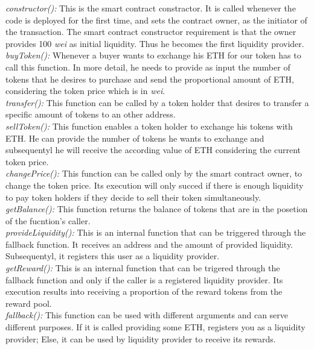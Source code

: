 \documentclass[12pt,a4paper]{article}
\begin{document}
\emph{constructor():} This is the smart contract constractor. It is called
whenever the code is deployed for the first time, and sets the contract owner,
as the initiator of the transaction. The smart contract constructor requirement
is that the owner provides 100 \emph{wei} as initial liquidity. Thus he becomes
the first liquidity provider.\\

\emph{buyToken():} Whenever a buyer wants to exchange his ETH for our token has
to call this function. In more detail, he needs to provide as input the number
of tokens that he desires to purchase and send the proportional amount of ETH,
considering the token price which is in \emph{wei}.\\

\emph{transfer():} This function can be called by a token holder that desires to
transfer a specific amount of tokens to an other address.\\

\emph{sellToken():} This function enables a token holder to exchange his tokens
with ETH. He can provide the number of tokens he wants to exchange and
subsequentyl he will receive the according value of ETH considering the current
token price.\\

\emph{changePrice():} This function can be called only by the smart contract
owner, to change the token price. Its execution will only succed if there is
enough liquidity to pay token holders if they decide to sell their token
simultaneously.\\

\emph{getBalance():} This function returns the balance of tokens that are in the
posetion of the fucntion's caller.\\

\emph{provideLiquidity():} This is an internal function that can be triggered
through the fallback function. It receives an address and the amount of provided
liquidity. Subsequentyl, it registers this user as a liquidity provider. \\

\emph{getReward():} This is an internal function that can be trigered through
the fallback function and only if the caller is a registered liquidity provider.
Its execution results into receiving a proportion of the reward tokens from the
reward pool.\\

\emph{fallback():} This function can be used with different arguments and can
serve different purposes. If it is called providing some ETH, registers you as a
liquidity provider; Else, it can be used by liquidity provider to receive its
rewards.\\
\end{document}
